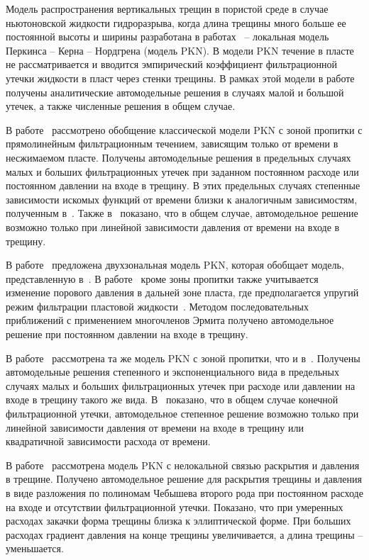 Модель распространения вертикальных трещин в пористой среде в случае ньютоновской жидкости гидроразрыва, когда длина трещины много больше ее постоянной высоты и ширины разработана в работах~\cite{Perkins_Kern, Nordgren1} – локальная модель Перкинса – Керна – Нордгрена (модель PKN). В модели PKN течение в пласте не рассматривается и вводится эмпирический коэффициент фильтрационной утечки жидкости в пласт через стенки трещины. В рамках этой модели в работе~\cite{Nordgren1} получены аналитические автомодельные решения в случаях малой и большой утечек, а также численные решения в общем случае.



В работе~\cite{Iv_Sm1} рассмотрено обобщение классической модели PKN с зоной пропитки с прямолинейным фильтрационным течением, зависящим только от времени в несжимаемом пласте. Получены автомодельные решения в предельных случаях малых и больших фильтрационных утечек при заданном постоянном расходе или постоянном давлении на входе в трещину. В этих предельных случаях степенные зависимости искомых функций от времени близки к аналогичным зависимостям, полученным в~\cite{Nordgren1}. Также в~\cite{Iv_Sm1} показано, что в общем случае, автомодельное решение возможно только при линейной зависимости давления от времени на входе в трещину.



В работе~\cite{Gord_Z1} предложена двухзональная модель PKN, которая обобщает модель, представленную в~\cite{Iv_Sm1}. В работе~\cite{Gord_Z1} кроме зоны пропитки также учитывается изменение порового давления в дальней зоне пласта, где предполагается упругий режим фильтрации пластовой жидкости~\cite{Smirn_Tag1}. Методом последовательных приближений с применением многочленов Эрмита получено автомодельное решение при постоянном давлении на входе в трещину.



В работе~\cite{Basn1} рассмотрена та же модель PKN с зоной пропитки, что и в~\cite{Iv_Sm1}. Получены автомодельные решения степенного и экспоненциального вида в предельных случаях малых и больших фильтрационных утечек при расходе или давлении на входе в трещину такого же вида. В~\cite{Basn1} показано, что в общем случае конечной фильтрационной утечки, автомодельное степенное решение возможно только при линейной зависимости давления от времени на входе в трещину или квадратичной зависимости расхода от времени.



В работе~\cite{Teod_tr1} рассмотрена модель PKN с нелокальной связью раскрытия и давления в трещине. Получено автомодельное решение для раскрытия трещины и давления в виде разложения по полиномам Чебышева второго рода при постоянном расходе на входе и отсутствии фильтрационной утечки. Показано, что при умеренных расходах закачки форма трещины близка к эллиптической форме. При больших расходах градиент давления на конце трещины увеличивается, а длина трещины – уменьшается.



